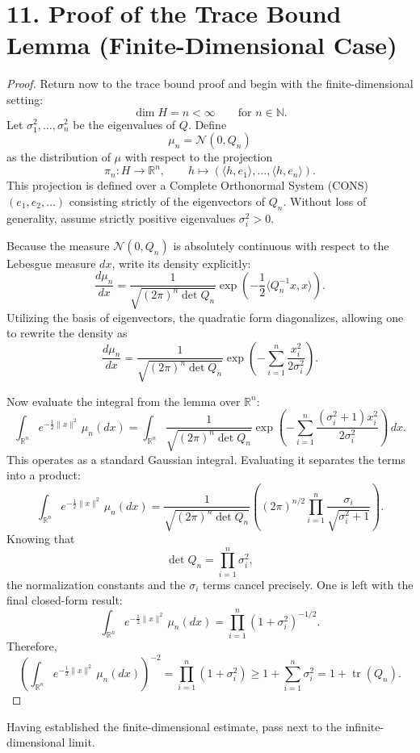 \documentclass[11pt]{article}
\theoremstyle{definition}
\theoremstyle{remark}
\DeclareMathOperator{\tr}{tr}
\begin{document}
\section*{11. Proof of the Trace Bound Lemma (Finite-Dimensional Case)}
\begin{proof}
Return now to the trace bound proof and begin with the finite-dimensional setting:
\[
\dim H=n<\infty
\qquad \text{for } n\in\mathbb N.
\]
Let \(\sigma_1^2,\ldots,\sigma_n^2\) be the eigenvalues of $Q$. Define
\[
\mu_n=\mathcal N(0,Q_n)
\]
as the distribution of \(\mu\) with respect to the projection
\[
\pi_n:H\to\mathbb R^n,
\qquad
h\mapsto (\langle h,e_1\rangle,\ldots,\langle h,e_n\rangle).
\]
This projection is defined over a Complete Orthonormal System (CONS) \((e_1,e_2,\ldots)\) consisting strictly of the eigenvectors of $Q_n$. Without loss of generality, assume strictly positive eigenvalues \(\sigma_i^2>0\).

Because the measure \(\mathcal N(0,Q_n)\) is absolutely continuous with respect to the Lebesgue measure \(dx\), write its density explicitly:
\[
\frac{d\mu_n}{dx}
=
\frac{1}{\sqrt{(2\pi)^n\det Q_n}}
\exp\left(-\frac{1}{2}\langle Q_n^{-1}x,x\rangle\right).
\]
Utilizing the basis of eigenvectors, the quadratic form diagonalizes, allowing one to rewrite the density as
\[
\frac{d\mu_n}{dx}
=
\frac{1}{\sqrt{(2\pi)^n\det Q_n}}
\exp\left(-\sum_{i=1}^n \frac{x_i^2}{2\sigma_i^2}\right).
\]

Now evaluate the integral from the lemma over \(\mathbb R^n\):
\[
\int_{\mathbb R^n} e^{-\frac{1}{2}\|x\|^2}\,\mu_n(dx)
=
\int_{\mathbb R^n}
\frac{1}{\sqrt{(2\pi)^n\det Q_n}}
\exp\left(-\sum_{i=1}^n \frac{(\sigma_i^2+1)x_i^2}{2\sigma_i^2}\right)\,dx.
\]
This operates as a standard Gaussian integral. Evaluating it separates the terms into a product:
\[
\int_{\mathbb R^n} e^{-\frac{1}{2}\|x\|^2}\,\mu_n(dx)
=
\frac{1}{\sqrt{(2\pi)^n\det Q_n}}
\left(
(2\pi)^{n/2}
\prod_{i=1}^n \frac{\sigma_i}{\sqrt{\sigma_i^2+1}}
\right).
\]
Knowing that
\[
\det Q_n=\prod_{i=1}^n \sigma_i^2,
\]
the normalization constants and the \(\sigma_i\) terms cancel precisely. One is left with the final closed-form result:
\[
\int_{\mathbb R^n} e^{-\frac{1}{2}\|x\|^2}\,\mu_n(dx)
=
\prod_{i=1}^n (1+\sigma_i^2)^{-1/2}.
\]
Therefore,
\[
\left(\int_{\mathbb R^n} e^{-\frac{1}{2}\|x\|^2}\,\mu_n(dx)\right)^{-2}
=
\prod_{i=1}^n (1+\sigma_i^2)
\ge
1+\sum_{i=1}^n \sigma_i^2
=
1+\tr(Q_n).
\]
\end{proof}

Having established the finite-dimensional estimate, pass next to the infinite-dimensional limit.
\end{document}
